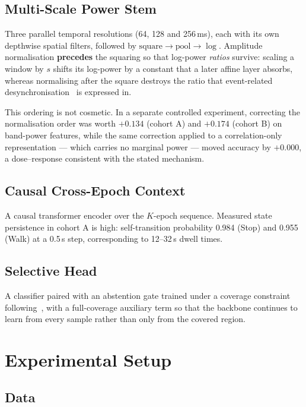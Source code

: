 \documentclass[conference]{IEEEtran}
\begin{document}
\subsection{Multi-Scale Power Stem}

Three parallel temporal resolutions (64, 128 and 256\,ms), each with its own
depthwise spatial filters, followed by
$\mathrm{square} \rightarrow \mathrm{pool} \rightarrow \log$. Amplitude
normalisation \textbf{precedes} the squaring so that log-power \emph{ratios}
survive: scaling a window by $s$ shifts its log-power by a constant that a later
affine layer absorbs, whereas normalising after the square destroys the ratio
that event-related desynchronisation~\cite{erd} is expressed in.

This ordering is not cosmetic. In a separate controlled experiment, correcting
the normalisation order was worth $+0.134$ (cohort A) and $+0.174$ (cohort B) on
band-power features, while the same correction applied to a correlation-only
representation --- which carries no marginal power --- moved accuracy by
$+0.000$, a dose--response consistent with the stated mechanism.

\subsection{Causal Cross-Epoch Context}

A causal transformer encoder over the $K$-epoch sequence. Measured state
persistence in cohort A is high: self-transition probability 0.984 (Stop) and
0.955 (Walk) at a 0.5\,s step, corresponding to 12--32\,s dwell times.

\subsection{Selective Head}

A classifier paired with an abstention gate trained under a coverage constraint
following~\cite{selectivenet}, with a full-coverage auxiliary term so that the
backbone continues to learn from every sample rather than only from the covered
region.

\section{Experimental Setup}

\subsection{Data}
\end{document}
